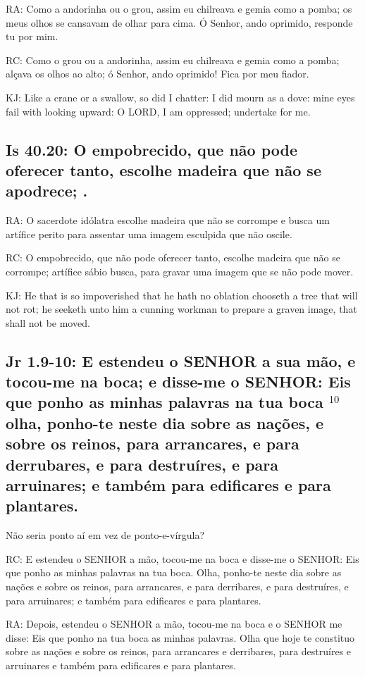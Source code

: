 RA: Como a andorinha ou o grou, assim eu chilreava e gemia como a pomba; os meus olhos se cansavam de olhar para cima. Ó Senhor, ando oprimido, responde tu por mim.

RC: Como o grou ou a andorinha, assim eu chilreava e gemia como a pomba; alçava os olhos ao alto; ó Senhor, ando oprimido! Fica por meu fiador.

KJ: Like a crane or a swallow, so did I chatter: I did mourn as a dove: mine eyes fail with looking upward: O LORD, I am oppressed; undertake for me.

\subsection{Is 40.20: O empobrecido, que não pode oferecer tanto, escolhe madeira que não se apodrece; .}

RA: O sacerdote idólatra escolhe madeira que não se corrompe e busca um artífice perito para assentar uma imagem esculpida que não oscile.

RC: O empobrecido, que não pode oferecer tanto, escolhe madeira que não se corrompe; artífice sábio busca, para gravar uma imagem que se não pode mover.

KJ: He that is so impoverished that he hath no oblation chooseth a tree that will not rot; he seeketh unto him a cunning workman to prepare a graven image, that shall not be moved.

\subsection{Jr 1.9-10: E estendeu o SENHOR a sua mão, e tocou-me na boca; e disse-me o SENHOR: Eis que ponho as minhas palavras na tua boca\uwave{;} $^{\mathrm{10}}$olha, ponho-te neste dia sobre as nações, e sobre os reinos, para arrancares, e para derrubares, e para destruíres, e para arruinares; e também para edificares e para plantares.}

Não seria ponto aí em vez de ponto-e-vírgula?

RC: E estendeu o SENHOR a mão, tocou-me na boca e disse-me o SENHOR: Eis que ponho as minhas palavras na tua boca. Olha, ponho-te neste dia sobre as nações e sobre os reinos, para arrancares, e para derribares, e para destruíres, e para arruinares; e também para edificares e para plantares.

RA: Depois, estendeu o SENHOR a mão, tocou-me na boca e o SENHOR me disse: Eis que ponho na tua boca as minhas palavras. Olha que hoje te constituo sobre as nações e sobre os reinos, para arrancares e derribares, para destruíres e arruinares e também para edificares e para plantares.

